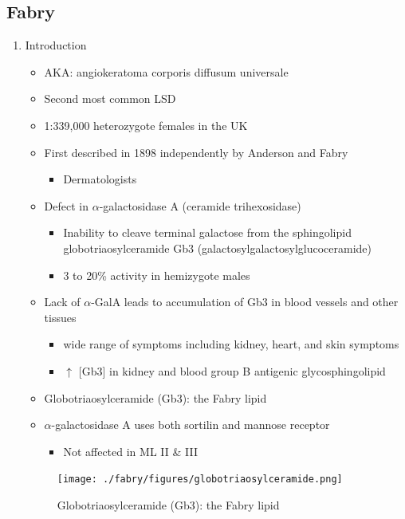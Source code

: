 \documentclass{scrartcl}
\begin{document}
\subsection{Fabry}
\label{sec:orgc45e97c}
\begin{enumerate}
\item Introduction
\label{sec:org8953b8b}
\begin{itemize}
\item AKA: angiokeratoma corporis diffusum universale
\item Second most common LSD
\item 1:339,000 heterozygote females in the UK
\item First described in 1898 independently by Anderson and Fabry
\begin{itemize}
\item Dermatologists
\end{itemize}
\item Defect in \(\alpha\)-galactosidase A (ceramide trihexosidase)
\begin{itemize}
\item Inability to cleave terminal galactose from the sphingolipid globotriaosylceramide Gb3 (galactosylgalactosylglucoceramide)
\item 3 to 20\% activity in hemizygote males
\end{itemize}
\item Lack of \(\alpha\)-GalA leads to accumulation of Gb3 in blood vessels and other tissues
\begin{itemize}
\item wide range of symptoms including kidney, heart, and skin symptoms
\item \(\uparrow\) [Gb3] in kidney and blood group B antigenic glycosphingolipid
\end{itemize}
\item Globotriaosylceramide (Gb3): the Fabry lipid
\item \(\alpha\)-galactosidase A uses both sortilin and mannose receptor
\begin{itemize}
\item Not affected in ML II \& III
\end{itemize}
\end{itemize}

\begin{figure}[htbp]
\centering
\texttt{[image: ./fabry/figures/globotriaosylceramide.png]}
\caption[Globotriaosylceramide]{\label{fig:org07ab3bb}
Globotriaosylceramide (Gb3): the Fabry lipid}
\end{figure}


\end{enumerate}
\end{document}
